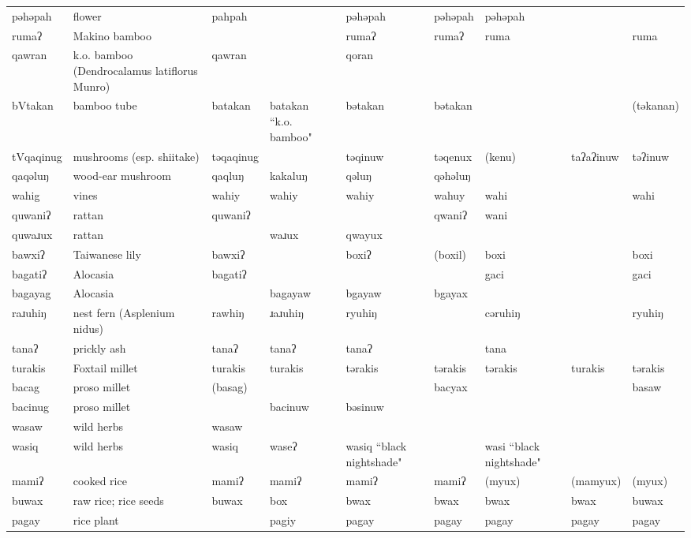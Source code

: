 \begin{landscape}
\begin{longtable}{*{9}{p{}}}
\text{*}pəhəpah & flower & pahpah &  & pəhəpah & pəhəpah & pəhəpah &  & \\
\text{*}rumaʔ & Makino bamboo &  &  & rumaʔ & rumaʔ & ruma &  & ruma\\
\text{*}qawran & k.o. bamboo (Dendrocalamus latiflorus Munro) & qawran &  & qoran &  &  &  & \\
\text{*}bVtakan & bamboo tube & batakan & batakan ``k.o. bamboo" & bətakan & bətakan &  &  & (təkanan)\\
\text{*}tVqaqinug & mushrooms (esp. shiitake) & təqaqinug &  & təqinuw & təqenux & (kenu) & taʔaʔinuw & təʔinuw\\
\text{*}qaqəluŋ & wood-ear mushroom & qaqluŋ & kakaluŋ & qəluŋ & qəhəluŋ &  &  & \\
\text{*}wahig & vines & wahiy & wahiy & wahiy & wahuy & wahi &  & wahi\\
\text{*}quwaniʔ & rattan & quwaniʔ &  &  & qwaniʔ & wani &  & \\
\text{*}quwaɹux & rattan &  & waɹux & qwayux &  &  &  & \\
\text{*}bawxiʔ & Taiwanese lily & bawxiʔ &  & boxiʔ & (boxil) & boxi &  & boxi\\
\text{*}bagatiʔ & Alocasia & bagatiʔ &  &  &  & gaci &  & gaci\\
\text{*}bagayag & Alocasia &  & bagayaw & bgayaw & bgayax &  &  & \\
\text{*}raɹuhiŋ & nest fern (Asplenium nidus) & rawhiŋ & ɹaɹuhiŋ & ryuhiŋ &  & cəruhiŋ &  & ryuhiŋ\\
\text{*}tanaʔ & prickly ash & tanaʔ & tanaʔ & tanaʔ &  & tana &  & \\
\text{*}turakis & Foxtail millet & turakis & turakis & tərakis & tərakis & tərakis & turakis & tərakis\\
\text{*}bacag & proso millet & (basag) &  &  & bacyax &  &  & basaw\\
\text{*}bacinug & proso millet &  & bacinuw & bəsinuw &  &  &  & \\
\text{*}wasaw & wild herbs & wasaw &  &  &  &  &  & \\
\text{*}wasiq & wild herbs & wasiq & waseʔ & wasiq ``black nightshade" &  & wasi ``black nightshade" &  & \\
\text{*}mamiʔ & cooked rice & mamiʔ & mamiʔ & mamiʔ & mamiʔ & (myux) & (mamyux) & (myux)\\
\text{*}buwax & raw rice; rice seeds & buwax & box & bwax & bwax & bwax & bwax & buwax\\
\text{*}pagay & rice plant &  & pagiy & pagay & pagay & pagay & pagay & pagay\\

\end{longtable}
\end{landscape}
